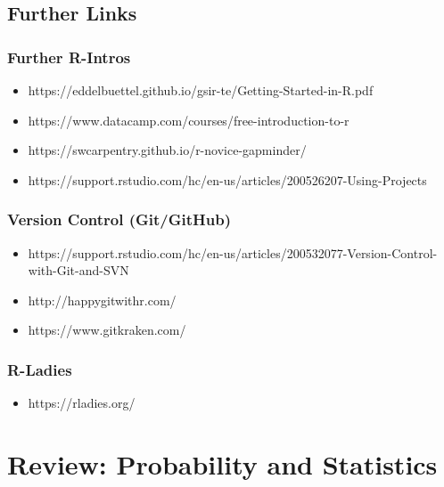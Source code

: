 \documentclass[
  letterpaper,
  DIV=11,
  numbers=noendperiod]{scrreprt}
\providecommand{\tightlist}{%
  \setlength{\itemsep}{0pt}\setlength{\parskip}{0pt}}\usepackage{longtable,booktabs,array}
\theoremstyle{definition}
\theoremstyle{plain}
\theoremstyle{plain}
\theoremstyle{remark}
\begin{document}
\hypertarget{further-links}{%
\section{Further Links}\label{further-links}}

\hypertarget{further-r-intros}{%
\subsection{Further R-Intros}\label{further-r-intros}}

\begin{itemize}
\item
  https://eddelbuettel.github.io/gsir-te/Getting-Started-in-R.pdf
\item
  https://www.datacamp.com/courses/free-introduction-to-r
\item
  https://swcarpentry.github.io/r-novice-gapminder/
\item
  https://support.rstudio.com/hc/en-us/articles/200526207-Using-Projects
\end{itemize}

\hypertarget{version-control-gitgithub}{%
\subsection{Version Control
(Git/GitHub)}\label{version-control-gitgithub}}

\begin{itemize}
\item
  https://support.rstudio.com/hc/en-us/articles/200532077-Version-Control-with-Git-and-SVN
\item
  http://happygitwithr.com/
\item
  https://www.gitkraken.com/
\end{itemize}

\hypertarget{r-ladies}{%
\subsection{R-Ladies}\label{r-ladies}}

\begin{itemize}
\tightlist
\item
  https://rladies.org/
\end{itemize}


\hypertarget{ReviewStats}{%
\chapter{Review: Probability and Statistics}\label{ReviewStats}}
\end{document}

